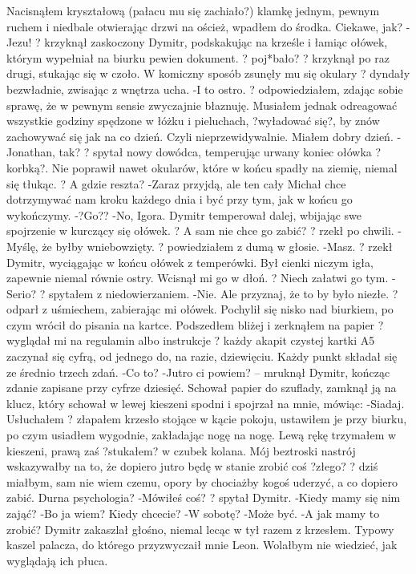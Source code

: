 \documentclass[../MAIN.tex]{subfiles}
\begin{document}
Nacisnąłem kryształową (pałacu mu się zachiało?) klamkę jednym, pewnym ruchem i niedbale otwierając drzwi na oścież, wpadłem do środka. Ciekawe, jak?
-Jezu! ? krzyknął zaskoczony Dymitr, podskakując na krześle i łamiąc ołówek, którym wypełniał na biurku pewien dokument. ? poj*bało? ? krzyknął po raz drugi, stukając się w czoło. W komiczny sposób zsunęły mu się okulary ? dyndały bezwładnie, zwisając z wnętrza ucha.
-I to ostro. ? odpowiedziałem, zdając sobie sprawę, że w pewnym sensie zwyczajnie błaznuję. Musiałem jednak odreagować wszystkie godziny spędzone w łóżku i pieluchach, ?wyładować się?, by znów zachowywać się jak na co dzień. Czyli nieprzewidywalnie.
Miałem dobry dzień.
-Jonathan, tak? ? spytał nowy dowódca, temperując urwany koniec ołówka ?korbką?. Nie poprawił nawet okularów, które w końcu spadły na ziemię, niemal się tłukąc. ? A gdzie reszta?
-Zaraz przyjdą, ale ten cały Michał chce dotrzymywać nam kroku każdego dnia i być przy tym, jak w końcu go wykończymy.
-?Go??
-No, Igora.
Dymitr temperował dalej, wbijając swe spojrzenie w kurczący się ołówek. ? A sam nie chce go zabić? ? rzekł po chwili.
-Myślę, że byłby wniebowzięty. ? powiedziałem z dumą w głosie.
-Masz. ? rzekł Dymitr, wyciągając w końcu ołówek z temperówki. Był cienki niczym igła, zapewnie niemal równie ostry. Wcisnął mi go w dłoń. ? Niech załatwi go tym.
-Serio? ? spytałem z niedowierzaniem.
-Nie. Ale przyznaj, że to by było niezłe. ? odparł z uśmiechem, zabierając mi ołówek. Pochylił się nisko nad biurkiem, po czym wrócił do pisania na kartce. Podszedłem bliżej i zerknąłem na papier ? wyglądał mi na regulamin albo instrukcje ? każdy akapit czystej kartki A5 zaczynał się cyfrą, od jednego do, na razie, dziewięciu. Każdy punkt składał się ze średnio trzech zdań.
-Co to?
-Jutro ci powiem? -- mruknął Dymitr, kończąc zdanie zapisane przy cyfrze dziesięć. Schował papier do szuflady, zamknął ją na klucz, który schował w lewej kieszeni spodni i spojrzał na mnie, mówiąc:
-Siadaj.
Usłuchałem ? złapałem krzesło stojące w kącie pokoju, ustawiłem je przy biurku, po czym usiadłem wygodnie, zakładając nogę na nogę. Lewą rękę trzymałem w kieszeni, prawą zaś ?stukałem? w czubek kolana. Mój beztroski nastrój wskazywałby na to, że dopiero jutro będę w stanie zrobić coś ?złego? ? dziś miałbym, sam nie wiem czemu, opory by chociażby kogoś uderzyć, a co dopiero zabić.
Durna psychologia?
-Mówiłeś coś? ? spytał Dymitr.
-Kiedy mamy się nim zająć?
-Bo ja wiem? Kiedy chcecie?
-W sobotę?
-Może być.
-A jak mamy to zrobić?
Dymitr zakaszlał głośno, niemal lecąc w tył razem z krzesłem. Typowy kaszel palacza, do którego przyzwyczaił mnie Leon. Wolałbym nie wiedzieć, jak wyglądają ich płuca.
\end{document}
